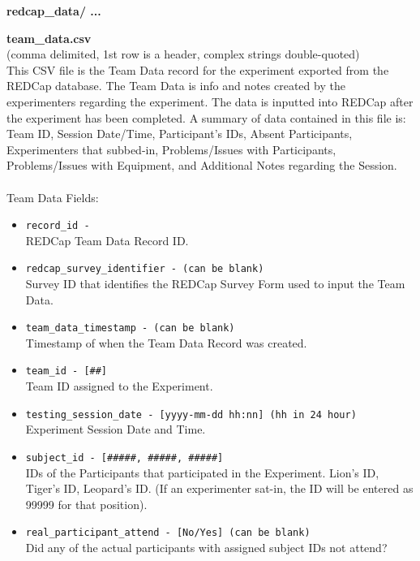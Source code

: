 \begin{description}
\item\textbf{redcap\_data/ ...}

    \begin{addmargin}[0em]{0em} %
        \label{team_data.csv}
        \textbf{team\_data.csv}\\(comma delimited, 1st row is a header, complex strings double-quoted)\\
        This CSV file is the Team Data record for the experiment exported from the REDCap database.
        The Team Data is info and notes created by the experimenters regarding the experiment.
        The data is inputted into REDCap after the experiment has been completed.
        A summary of data contained in this file is: Team ID, Session Date/Time, Participant's IDs, Absent Participants,
        Experimenters that subbed-in, Problems/Issues with Participants, Problems/Issues with Equipment, and Additional Notes regarding the Session.\\\\
        Team Data Fields:
        \begin{itemize}
            \item \verb|record_id -|\\REDCap Team Data Record ID.
            \item \verb|redcap_survey_identifier - (can be blank)|\\Survey ID that identifies the REDCap Survey Form used to input the Team Data.
            \item \verb|team_data_timestamp - (can be blank)|\\Timestamp of when the Team Data Record was created.
            \item \verb|team_id - [##]|\\Team ID assigned to the Experiment.
            \item \verb|testing_session_date - [yyyy-mm-dd hh:nn] (hh in 24 hour)|\\Experiment Session Date and Time.
            \item \verb|subject_id - [#####, #####, #####]|\\IDs of the Participants that participated in the Experiment. Lion's ID, Tiger's ID, Leopard's ID. (If an experimenter sat-in, the ID will be entered as 99999 for that position).
            \item \verb|real_participant_attend - [No/Yes] (can be blank)|\\Did any of the actual participants with assigned subject IDs not attend?

\end{itemize}
\end{addmargin}
\end{description}
